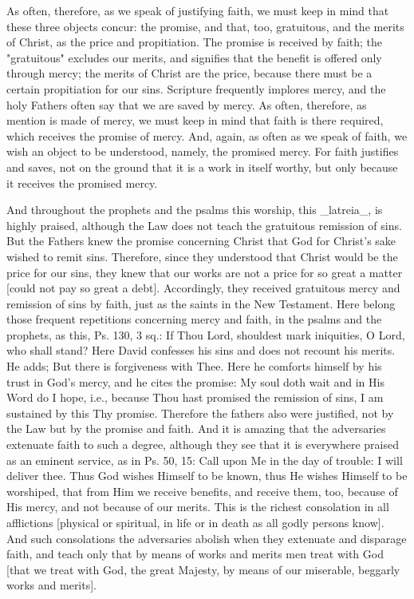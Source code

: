 As often, therefore, as we speak of justifying faith, we must keep in
mind that these three objects concur: the promise, and that, too,
gratuitous, and the merits of Christ, as the price and propitiation.
The promise is received by faith; the "gratuitous" excludes our
merits, and signifies that the benefit is offered only through mercy;
the merits of Christ are the price, because there must be a certain
propitiation for our sins.  Scripture frequently implores mercy, and
the holy Fathers often say that we are saved by mercy.  As often,
therefore, as mention is made of mercy, we must keep in mind that
faith is there required, which receives the promise of mercy.  And,
again, as often as we speak of faith, we wish an object to be
understood, namely, the promised mercy.  For faith justifies and
saves, not on the ground that it is a work in itself worthy, but only
because it receives the promised mercy.

And throughout the prophets and the psalms this worship, this
_latreia_, is highly praised, although the Law does not teach the
gratuitous remission of sins.  But the Fathers knew the promise
concerning Christ that God for Christ's sake wished to remit sins.
Therefore, since they understood that Christ would be the price for
our sins, they knew that our works are not a price for so great a
matter [could not pay so great a debt].  Accordingly, they received
gratuitous mercy and remission of sins by faith, just as the saints
in the New Testament.  Here belong those frequent repetitions
concerning mercy and faith, in the psalms and the prophets, as this,
Ps. 130, 3 sq.: If Thou Lord, shouldest mark iniquities, O Lord, who
shall stand?  Here David confesses his sins and does not recount his
merits.  He adds; But there is forgiveness with Thee.  Here he
comforts himself by his trust in God's mercy, and he cites the
promise: My soul doth wait and in His Word do I hope, i.e., because
Thou hast promised the remission of sins, I am sustained by this Thy
promise.  Therefore the fathers also were justified, not by the Law
but by the promise and faith.  And it is amazing that the adversaries
extenuate faith to such a degree, although they see that it is
everywhere praised as an eminent service, as in Ps. 50, 15: Call upon
Me in the day of trouble: I will deliver thee.  Thus God wishes
Himself to be known, thus He wishes Himself to be worshiped, that
from Him we receive benefits, and receive them, too, because of His
mercy, and not because of our merits.  This is the richest
consolation in all afflictions [physical or spiritual, in life or in
death as all godly persons know].  And such consolations the
adversaries abolish when they extenuate and disparage faith, and
teach only that by means of works and merits men treat with God [that
we treat with God, the great Majesty, by means of our miserable,
beggarly works and merits].




